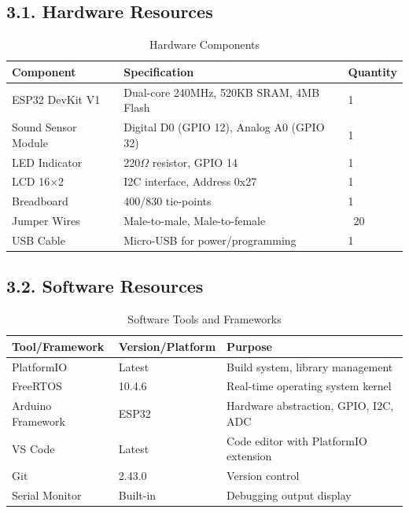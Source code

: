\documentclass[12pt]{article}
\begin{document}
\subsection*{3.1. Hardware Resources}

\begin{table}[H]
	\centering
	\caption{Hardware Components}
	\label{tab:hardware-resources}
	\begin{tabular}{|l|l|l|}
		\hline
		\textbf{Component} & \textbf{Specification} & \textbf{Quantity} \\
		\hline
		ESP32 DevKit V1 & Dual-core 240MHz, 520KB SRAM, 4MB Flash & 1 \\
		\hline
		Sound Sensor Module & Digital D0 (GPIO 12), Analog A0 (GPIO 32) & 1 \\
		\hline
		LED Indicator & 220$\Omega$ resistor, GPIO 14 & 1 \\		\hline
		LCD 16×2 & I2C interface, Address 0x27 & 1 \\
		\hline
		Breadboard & 400/830 tie-points & 1 \\
		\hline
		Jumper Wires & Male-to-male, Male-to-female & ~20 \\
		\hline
		USB Cable & Micro-USB for power/programming & 1 \\
		\hline
	\end{tabular}
\end{table}

\subsection*{3.2. Software Resources}

\begin{table}[H]
	\centering
	\caption{Software Tools and Frameworks}
	\label{tab:software-resources}
	\begin{tabular}{|l|l|l|}
		\hline
		\textbf{Tool/Framework} & \textbf{Version/Platform} & \textbf{Purpose} \\
		\hline
		PlatformIO & Latest & Build system, library management \\
		\hline
		FreeRTOS & 10.4.6 & Real-time operating system kernel \\
		\hline
		Arduino Framework & ESP32 & Hardware abstraction, GPIO, I2C, ADC \\
		\hline
		VS Code & Latest & Code editor with PlatformIO extension \\
		\hline
		Git & 2.43.0 & Version control \\
		\hline
		Serial Monitor & Built-in & Debugging output display \\
		\hline
	\end{tabular}
\end{table}
\end{document}
